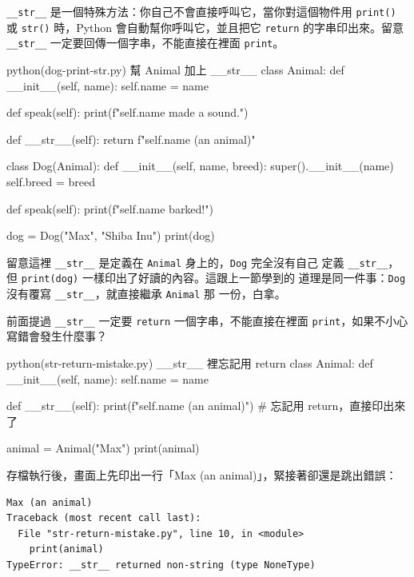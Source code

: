 \texttt{\_\_str\_\_} 是一個特殊方法：你自己不會直接呼叫它，當你對這個物件用
\texttt{print()} 或 \texttt{str()} 時，Python 會自動幫你呼叫它，並且把它 \texttt{return}
的字串印出來。留意 \texttt{\_\_str\_\_} 一定要回傳一個字串，不能直接在裡面 \texttt{print}。

\begin{example}{python}{(dog-print-str.py) 幫 Animal 加上 \_\_str\_\_}
class Animal:
    def __init__(self, name):
        self.name = name

    def speak(self):
        print(f"{self.name} made a sound.")

    def __str__(self):
        return f"{self.name} (an animal)"


class Dog(Animal):
    def __init__(self, name, breed):
        super().__init__(name)
        self.breed = breed

    def speak(self):
        print(f"{self.name} barked!")


dog = Dog("Max", "Shiba Inu")
print(dog)
\end{example}


留意這裡 \texttt{\_\_str\_\_} 是定義在 \texttt{Animal} 身上的，\texttt{Dog} 完全沒有自己
定義 \texttt{\_\_str\_\_}，但 \texttt{print(dog)} 一樣印出了好讀的內容。這跟上一節學到的
道理是同一件事：\texttt{Dog} 沒有覆寫 \texttt{\_\_str\_\_}，就直接繼承 \texttt{Animal} 那
一份，白拿。

前面提過 \texttt{\_\_str\_\_} 一定要 \texttt{return} 一個字串，不能直接在裡面
\texttt{print}，如果不小心寫錯會發生什麼事？

\begin{example}{python}{(str-return-mistake.py) \_\_str\_\_ 裡忘記用 return}
class Animal:
    def __init__(self, name):
        self.name = name

    def __str__(self):
        print(f"{self.name} (an animal)")  # 忘記用 return，直接印出來了


animal = Animal("Max")
print(animal)
\end{example}

存檔執行後，畫面上先印出一行「Max (an animal)」，緊接著卻還是跳出錯誤：

\begin{verbatim}
Max (an animal)
Traceback (most recent call last):
  File "str-return-mistake.py", line 10, in <module>
    print(animal)
TypeError: __str__ returned non-string (type NoneType)
\end{verbatim}

